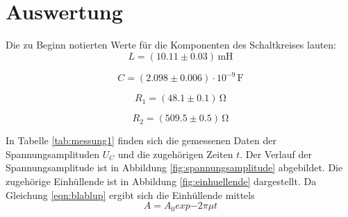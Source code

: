 \section{Auswertung}
\label{sec:Auswertung}
Die zu Beginn notierten Werte für die Komponenten des Schaltkreises lauten:
\begin{equation*}
  L=(10.11 \pm 0.03) \,\si{\milli\henry}
\end{equation*}

\begin{equation*}
C=(2.098 \pm 0.006) \cdot 10^{-9} \, \si{\farad}
\end{equation*}

\begin{equation*}
R_\text{1}= (48.1 \pm 0.1) \, \si{\ohm}
\end{equation*}

\begin{equation*}
R_\text{2}= (509.5\pm 0.5)\,\si{\ohm}
\end{equation*}


In Tabelle \ref{tab:messung1} finden sich die gemessenen Daten der Spannungsamplituden $U_C$ und die zugehörigen Zeiten $t$.
Der Verlauf der Spannungsamplitude ist in Abbildung \ref{fig:spannungsamplitude} abgebildet. Die zugehörige Einhüllende ist in Abbildung \ref{fig:einhuellende} dargestellt.
Da  Gleichung \eqref{eqn:blablup} ergibt sich die Einhüllende mittels
\begin{equation}
A=A_\text{0}exp{-2 \pi \mu t}
\end{equation}
